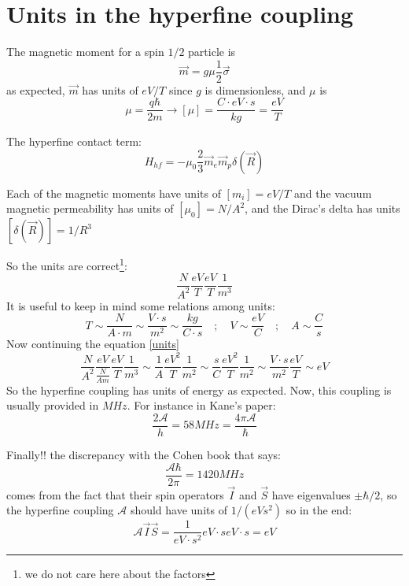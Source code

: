 \chapter{Units in the hyperfine coupling}
The magnetic moment for a spin $1/2$ particle is
\begin{equation}
\vec{m} = g\mu\frac{1}{2}\vec{\sigma}
\end{equation}
as expected, $\vec{m}$ has units of $eV/T$ since $g$ is dimensionless, and $\mu$ is
\begin{equation}
  \mu = \frac{q\hbar}{2m} \longrightarrow
  [\mu] = \frac{C\cdot eV\cdot s}{kg} = \frac{eV}{T}
\end{equation}

The hyperfine contact term:
\begin{equation}
  H_{hf} = -\mu_0\frac{2}{3} \vec{m}_e\vec{m}_p\delta(\vec{R})
\end{equation}


Each of the magnetic moments have units of $\left[m_i\right] = eV/T$ and the vacuum magnetic permeability has units of $\left[\mu_0\right]=N/A^2$, and the Dirac's delta has units $[\delta(\vec{R})]=1/R^3$

So the units are correct\footnote{we do not care here about the factors}:
\begin{equation}
  \frac{N}{A^2}\frac{eV}{T}\frac{eV}{T}\frac{1}{m^3}
\label{units}
\end{equation}
It is useful to keep in mind some relations among units:
\begin{equation}
  T \sim \frac{N}{A\cdot m}\sim\frac{V\cdot s}{m^2}\sim \frac{kg}{C\cdot s}
   \quad;\quad
  V\sim\frac{eV}{C} \quad;\quad A \sim\frac{C}{s}
\end{equation}
Now continuing the equation \eqref{units}
\begin{equation}
  \frac{N}{A^2}\frac{eV}{\frac{N}{Am}}\frac{eV}{T}\frac{1}{m^3} \sim
  \frac{1}{A}\frac{eV^2}{T}\frac{1}{m^2} \sim \frac{s}{C}\frac{eV^2}{T}\frac{1}{m^2} \sim \frac{V\cdot s}{m^2}\frac{eV}{T}\sim eV
\end{equation}
So the hyperfine coupling has units of energy as expected. Now, this coupling is usually provided in $MHz$. For instance in Kane's paper:
\begin{equation}
  \frac{2\mathcal{A}}{h} = 58MHz = \frac{4\pi\mathcal{A}}{\hbar}
\end{equation}

Finally!! the discrepancy with the Cohen book that says:
\begin{equation}
  \frac{\mathcal{A}\hbar}{2\pi} = 1420MHz
\end{equation}
comes from the fact that their spin operators $\vec{I}$ and $\vec{S}$ have eigenvalues $\pm\hbar/2$, so the hyperfine coupling $\mathcal{A}$ should have units of $1/(eVs^2)$ so in the end:
\begin{equation}
  \mathcal{A}\vec{I}\vec{S} = \frac{1}{eV\cdot s^2} eV\cdot s eV\cdot s = eV
\end{equation}
